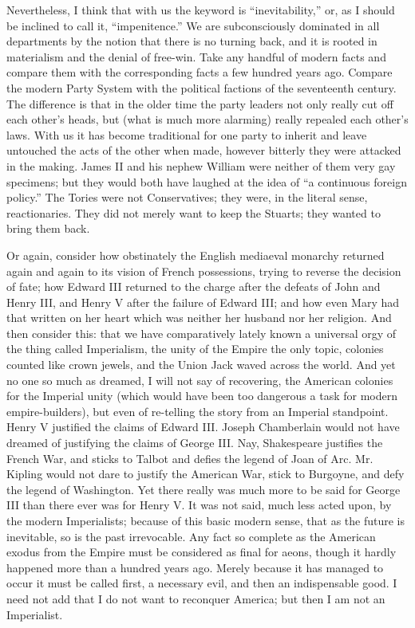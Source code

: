 \documentclass{book}
\begin{document}
Nevertheless, I think that with us the keyword is “inevitability,” or, as I should be inclined to call it, “impenitence.” We are subconsciously dominated in all departments by the notion that there is no turning back, and it is rooted in materialism and the denial of free-win. Take any handful of modern facts and compare them with the corresponding facts a few hundred years ago. Compare the modern Party System with the political factions of the seventeenth century. The difference is that in the older time the party leaders not only really cut off each other’s heads, but (what is much more alarming) really repealed each other’s laws. With us it has become traditional for one party to inherit and leave untouched the acts of the other when made, however bitterly they were attacked in the making. James II and his nephew William were neither of them very gay specimens; but they would both have laughed at the idea of “a continuous foreign policy.” The Tories were not Conservatives; they were, in the literal sense, reactionaries. They did not merely want to keep the Stuarts; they wanted to bring them back.

Or again, consider how obstinately the English mediaeval monarchy returned again and again to its vision of French possessions, trying to reverse the decision of fate; how Edward III returned to the charge after the defeats of John and Henry III, and Henry V after the failure of Edward III; and how even Mary had that written on her heart which was neither her husband nor her religion. And then consider this: that we have comparatively lately known a universal orgy of the thing called Imperialism, the unity of the Empire the only topic, colonies counted like crown jewels, and the Union Jack waved across the world. And yet no one so much as dreamed, I will not say of recovering, the American colonies for the Imperial unity (which would have been too dangerous a task for modern empire-builders), but even of re-telling the story from an Imperial standpoint. Henry V justified the claims of Edward III. Joseph Chamberlain would not have dreamed of justifying the claims of George III. Nay, Shakespeare justifies the French War, and sticks to Talbot and defies the legend of Joan of Arc. Mr. Kipling would not dare to justify the American War, stick to Burgoyne, and defy the legend of Washington. Yet there really was much more to be said for George III than there ever was for Henry V. It was not said, much less acted upon, by the modern Imperialists; because of this basic modern sense, that as the future is inevitable, so is the past irrevocable. Any fact so complete as the American exodus from the Empire must be considered as final for aeons, though it hardly happened more than a hundred years ago. Merely because it has managed to occur it must be called first, a necessary evil, and then an indispensable good. I need not add that I do not want to reconquer America; but then I am not an Imperialist.
\end{document}
